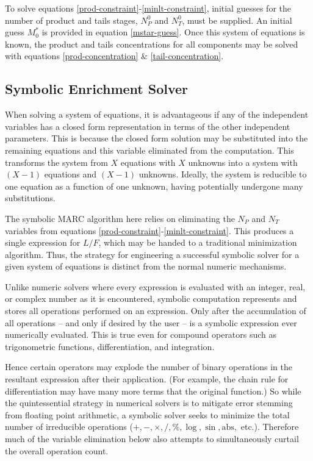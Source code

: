 \documentclass[preprint,12pt]{elsarticle}
\begin{document}
To solve equations \ref{prod-constraint}-\ref{minlt-constraint}, initial guesses
for the number of product and tails stages, $N_P^0$ and $N_T^0$, must be supplied.
An initial guess $M_0^*$ is provided in equation \ref{mstar-guess}.  Once this 
system of equations is known, the product and tails concentrations for all 
components may be solved with equations \ref{prod-concentration} \& 
\ref{tail-concentration}.

\subsection{Symbolic Enrichment Solver}
\label{sec:symes}

When solving a system of equations, it is advantageous if any of the independent 
variables has a closed form representation in terms of the other independent 
parameters. This is because the closed form solution may be substituted into 
the remaining equations and this variable eliminated from the computation.  This
transforms the system from $X$ equations with $X$ unknowns into a system with 
$(X-1)$ equations and $(X-1)$  unknowns.  Ideally, the system is reducible 
to one equation as a function of one unknown, having potentially undergone many 
substitutions.

The symbolic MARC algorithm here relies on eliminating the $N_P$ and $N_T$ variables
from equations \ref{prod-constraint}-\ref{minlt-constraint}. This produces a single
expression for $L/F$, which may be handed to a traditional minimization algorithm.
Thus, the strategy for engineering a successful symbolic solver for a given system
of equations is distinct from the normal numeric mechanisms.

Unlike numeric solvers where every expression is evaluated with an integer, real, or
complex number as it is encountered, symbolic computation represents and stores all 
operations performed on an expression.  Only after the accumulation of all 
operations -- and only if desired by the user -- is a symbolic expression ever numerically
evaluated.  This is true even for compound operators such as trigonometric functions, 
differentiation, and integration.

Hence certain operators may explode the number of binary
operations in the resultant expression after their application. 
(For example, the chain rule for differentiation may have many more terms that 
the original function.)
So while the quintessential strategy in numerical solvers is to mitigate error
stemming from floating point arithmetic, a symbolic solver seeks to minimize the total
number of irreducible operations ($+, -, \times, /, \%, \log, \sin, \mbox{abs},$ etc.). 
Therefore much of the variable
elimination below also attempts to simultaneously curtail the overall operation count. 
\end{document}
